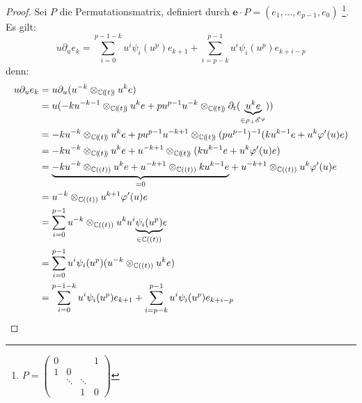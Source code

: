 \begin{proof}
Sei $P$ die Permutationsmatrix, definiert durch
$\mathbf{e}\cdot P=(e_1,...,e_{p-1},e_0)$
\footnote{$P=\begin{pmatrix}0 &  &  & 1\\
1 & 0\\
 & \ddots & \ddots\\
 &  & 1 & 0
\end{pmatrix}$}.\\
Es gilt:\\
\[ u\partial_ue_k= \sum_{i=0}^{p-1-k}u^i\psi_i(u^p)e_{k+1} +
  \sum_{i=p-k}^{p-1}u^i\psi_i(u^p)e_{k+i-p} \]
denn:\\
\begin{align*}
  u\partial_ue_k &= u\partial_u(u^{-k}\otimes_{\C(\!(t)\!)}u^ke)\\
  &= u(-ku^{-k-1}\otimes_{\C(\!(t)\!)}u^ke +
    pu^{p-1}u^{-k}\otimes_{\C(\!(t)\!)}\partial_t
    (\underset{\in\rho_+\sE^\phi}{\underbrace{u^ke}}))\\
  &= -ku^{-k}\otimes_{\C(\!(t)\!)}u^ke +
    pu^{p-1}u^{-k+1}\otimes_{\C(\!(t)\!)}(pu^{p-1})^{-1} (ku^{k-1}e
    + u^k\phi'(u)e)\\
  &= -ku^{-k}\otimes_{\C(\!(t)\!)}u^ke +
    u^{-k+1}\otimes_{\C(\!(t)\!)}(ku^{k-1}e + u^k\phi'(u)e)\\
  &= \underset{=0}{\underbrace{-ku^{-k}\otimes_{\C((t))}u^ke +
    u^{-k+1}\otimes_{\C((t))}ku^{k-1}e}} +
    u^{-k+1}\otimes_{\C((t))}u^k\phi'(u)e\\
  &= u^{-k}\otimes_{\C((t))}u^{k+1}\phi'(u)e\\
  &= \sum_{i=0}^{p-1}u^{-k}\otimes_{\C((t))}
    u^{k}u^i\underset{\in\C((t))}{\underbrace{\psi_i(u^p)}}e\\
  &= \sum_{i=0}^{p-1}u^i\psi_i(u^p)(u^{-k}\otimes_{\C((t))} u^{k}e)\\
  &= \sum_{i=0}^{p-1-k}u^i\psi_i(u^p)e_{k+1} +
  \sum_{i=p-k}^{p-1}u^i\psi_i(u^p)e_{k+i-p}
\end{align*}


\end{proof}

